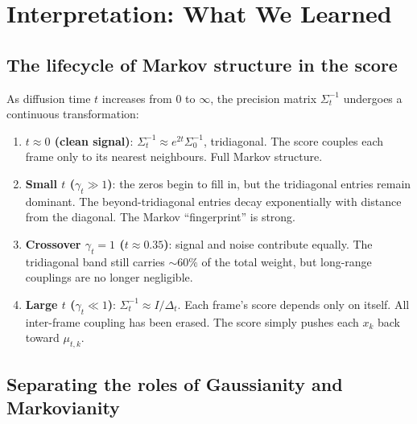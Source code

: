 \documentclass[11pt,a4paper]{article}
\theoremstyle{definition}
\newcommand{\Dt}{\Delta_t}
\begin{document}
\section{Interpretation: What We Learned}
\label{sec:interpretation}

\subsection{The lifecycle of Markov structure in the score}

As diffusion time $t$ increases from $0$ to $\infty$, the precision matrix $\Sigma_t^{-1}$ undergoes a continuous transformation:
\begin{enumerate}[nosep, leftmargin=2em]
  \item \textbf{$t \approx 0$ (clean signal)}: $\Sigma_t^{-1} \approx e^{2t}\Sigma_0^{-1}$, tridiagonal.  The score couples each frame only to its nearest neighbours.  Full Markov structure.
  \item \textbf{Small $t$ ($\gamma_t \gg 1$)}: the zeros begin to fill in, but the tridiagonal entries remain dominant.  The beyond-tridiagonal entries decay exponentially with distance from the diagonal.  The Markov ``fingerprint'' is strong.
  \item \textbf{Crossover $\gamma_t = 1$ ($t \approx 0.35$)}: signal and noise contribute equally.  The tridiagonal band still carries $\sim 60\%$ of the total weight, but long-range couplings are no longer negligible.
  \item \textbf{Large $t$ ($\gamma_t \ll 1$)}: $\Sigma_t^{-1} \approx I/\Dt$.  Each frame's score depends only on itself.  All inter-frame coupling has been erased.  The score simply pushes each $x_k$ back toward $\mu_{t,k}$.
\end{enumerate}

\subsection{Separating the roles of Gaussianity and Markovianity}
\end{document}
